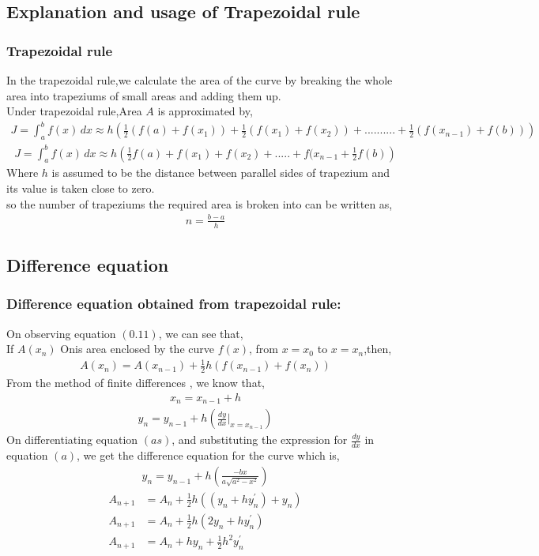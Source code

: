\documentclass{beamer}
\providecommand{\brak}[1]{\ensuremath{\left(#1\right)}}
\theoremstyle{remark}
\numberwithin{equation}{section}
\begin{document}
\subsection{Explanation and usage of Trapezoidal rule}
\begin{frame}
\frametitle{Trapezoidal rule}
In the trapezoidal rule,we calculate the area of the curve by breaking the whole area into trapeziums of small areas and adding them up.\\
Under trapezoidal rule,Area $A$ is approximated by,
\begin{align}
    J = \int_a^b f(x)\,dx \approx h\brak{\frac{1}{2}\brak{f(a) + f(x_1)} + \frac{1}{2}\brak{f(x_1) + f(x_2)} + ..........+ \frac{1}{2}\brak{f(x_{n-1})+ f(b)}}
\end{align}
\begin{align}
    J = \int_a^b f(x)\,dx \approx h\brak{\frac{1}{2}f(a) + f(x_1) + f(x_2) + ..... + f(x_{n-1} + \frac{1}{2}f(b)}
\end{align}
Where $h$ is assumed to be the distance between parallel sides of trapezium and its value is taken close to zero.\\
so the number of trapeziums the required area is broken into can be written as,
\begin{align}
    n = \frac{b - a}{h}
\end{align}
\end{frame}

\subsection{Difference equation}
\begin{frame}
\frametitle{Difference equation obtained from trapezoidal rule: }
On observing equation $\brak{0.11}$, we can see that,\\
If $A\brak{x_n}$ Onis area enclosed by the curve $f\brak{x}$, from $x=x_0$ to $x=x_n$,then,
\begin{align}
    A\brak{x_n} = A\brak{x_{n-1}} + \frac{1}{2}h\brak{f\brak{x_{n-1}} + f\brak{x_n}}
\end{align}
From the method of finite differences , we know that,
\begin{align}
    x_n = x_{n-1} + h
\end{align}
\begin{align}
    y_{n} = y_{n-1} + h\brak{\frac{dy}{dx}|_{x=x_{n-1}}}
\end{align}
On differentiating equation $\brak{as}$, and substituting the expression for $\frac{dy}{dx}$ in equation $\brak{a}$, we get the difference equation for the curve which is,
\begin{align}
     y_{n} = y_{n-1} + h\brak{\frac{-bx}{a\sqrt{a^2 - x^2}}}
\end{align}
\begin{align}
  A_{n+1}&=A_n+\frac{1}{2}h\brak{\brak{y_{n}+hy^{\prime}_n}+y_n}\\
  A_{n+1}&=A_n+\frac{1}{2}h\brak{2y_n+hy^{\prime}_n}\\
  A_{n+1}&=A_n+hy_n+\frac{1}{2}h^2y^{\prime}_n\\
\end{align}
\end{frame}
\end{document}
